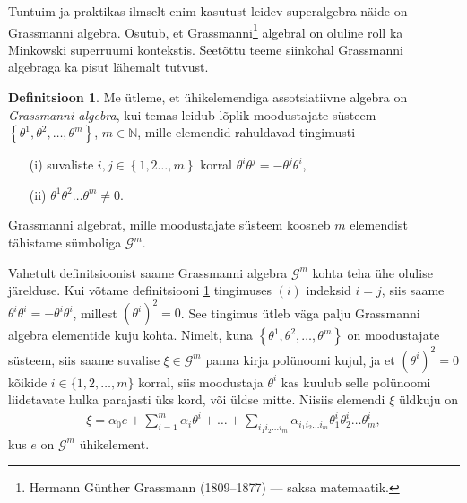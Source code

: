 \documentclass[12pt,a4paper,oneside]{article}
\theoremstyle{plain}
\theoremstyle{definition}
\newtheorem{definitsioon}{Definitsioon}[section]
\numberwithin{equation}{section}
\def\N{{\mathbb N}}
\def\G{{\mathcal G}}
\begin{document}
Tuntuim ja praktikas ilmselt enim kasutust leidev superalgebra näide 
on Grassmanni algebra. Osutub, et 
Grassmanni\footnote{Hermann Günther Grassmann (1809--1877) --- 
saksa matemaatik.} algebral on oluline roll ka Minkowski 
superruumi kontekstis. Seetõttu teeme siinkohal Grassmanni 
algebraga ka pisut lähemalt tutvust.

\begin{definitsioon} \label{def:grassmann}
Me ütleme, et ühikelemendiga assotsiatiivne algebra on 
\emph{Grassmanni algebra}, kui temas leidub lõplik moodustajate 
süsteem $\left\lbrace\theta^1, \theta^2, \ldots, 
\theta^m\right\rbrace$, $m \in \N$, mille elemendid rahuldavad 
tingimusti \begin{itemize}
\item[(i)] suvaliste $i, j \in \left\lbrace 1, 2 \ldots, 
m \right\rbrace$ korral $\theta^i \theta^j = - \theta^j \theta^i$,
\item[(ii)] $\theta^1 \theta^2 \ldots \theta^m \neq 0$.
\end{itemize}
Grassmanni algebrat, mille moodustajate süsteem koosneb $m$ 
elemendist tähistame sümboliga $\G^m$.
\end{definitsioon}

Vahetult definitsioonist saame Grassmanni algebra $\G^m$ kohta 
teha ühe olulise järelduse. Kui võtame definitsiooni 
\ref{def:grassmann} tingimuses $(i)$ indeksid $i = j$, siis saame 
$\theta^i \theta^i = -\theta^i \theta^i$, millest
$\left(\theta^i\right)^2 = 0$. See tingimus ütleb väga palju 
Grassmanni algebra elementide kuju kohta. Nimelt, kuna 
$\left\lbrace\theta^1, \theta^2, \ldots, \theta^m\right\rbrace$ 
on moodustajate süsteem, siis saame suvalise $\xi \in \G^m$ 
panna kirja polünoomi kujul, ja et $\left(\theta^i\right)^2 = 0$ 
kõikide $i \in \{1, 2, \ldots, m\}$ korral, siis moodustaja 
$\theta^i$ kas kuulub selle polünoomi liidetavate hulka parajasti 
üks kord, või üldse mitte. Niisiis elemendi $\xi$ üldkuju on
\begin{align*}
\xi = \alpha_0 e + \sum_{i = 1}^{m} \alpha_i \theta^i + \ldots + 
\sum_{i_1 i_2 \ldots i_m} \alpha_{i_1 i_2 \ldots i_m} 
\theta^i_1 \theta^i_2 \ldots \theta^i_m,
\end{align*}
kus $e$ on $\G^m$ ühikelement.
\end{document}
